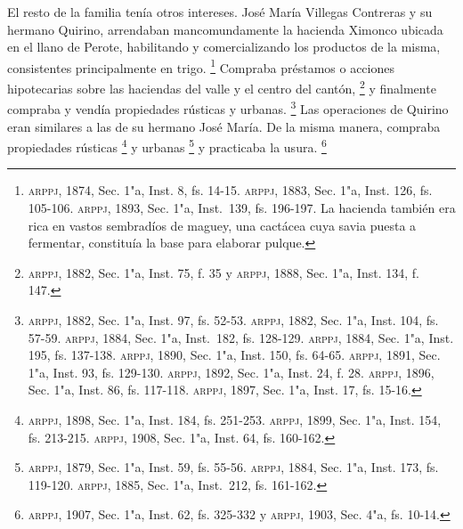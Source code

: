 \documentclass[14pt,twoside,final]{extbook} %
\let\oldfootnote\footnote
\renewcommand\footnote[1]{%
\oldfootnote{\hspace{1mm}#1}}
\begin{document}
El resto de la familia tenía otros intereses. José María Villegas Contreras y su hermano Quirino, arrendaban mancomundamente la hacienda Ximonco ubicada en el llano de Perote, habilitando y comercializando los productos de la misma, consistentes principalmente en trigo.\footnote{\textsc{arppj}, 1874, Sec. 1"a, Inst. 8, fs. 14-15. \textsc{arppj}, 1883, Sec. 1"a, Inst. 126, fs. 105-106. \textsc{arppj}, 1893, Sec. 1"a, Inst.~139, fs. 196-197. La hacienda también era rica en vastos sembradíos de maguey, una cactácea cuya savia puesta a fermentar, constituía la base para elaborar pulque.} Compraba préstamos o acciones hipotecarias sobre las haciendas del valle y el centro del cantón,\footnote{\textsc{arppj}, 1882, Sec. 1"a, Inst. 75, f. 35 y \textsc{arppj}, 1888, Sec. 1"a, Inst. 134, f. 147.} y finalmente compraba y vendía propiedades rústicas y urbanas.\footnote{\textsc{arppj}, 1882, Sec. 1"a, Inst. 97, fs. 52-53. \textsc{arppj}, 1882, Sec. 1"a, Inst. 104, fs. 57-59. \textsc{arppj}, 1884, Sec. 1"a, Inst.~182, fs. 128-129. \textsc{arppj}, 1884, Sec. 1"a, Inst. 195, fs. 137-138. \textsc{arppj}, 1890, Sec. 1"a, Inst. 150, fs. 64-65. \textsc{arppj}, 1891, Sec. 1"a, Inst. 93, fs. 129-130. \textsc{arppj}, 1892, Sec. 1"a, Inst. 24, f. 28. \textsc{arppj}, 1896, Sec. 1"a, Inst. 86, fs. 117-118. \textsc{arppj}, 1897, Sec. 1"a, Inst. 17, fs. 15-16.} Las operaciones de Quirino eran similares a las de su hermano José María. De la misma manera, compraba propiedades rústicas\footnote{\textsc{arppj}, 1898, Sec. 1"a, Inst. 184, fs. 251-253. \textsc{arppj}, 1899, Sec. 1"a, Inst. 154, fs. 213-215. \textsc{arppj}, 1908, Sec. 1"a, Inst. 64, fs. 160-162.} y urbanas\footnote{\textsc{arppj}, 1879, Sec. 1"a, Inst. 59, fs. 55-56. \textsc{arppj}, 1884, Sec. 1"a, Inst. 173, fs. 119-120. \textsc{arppj}, 1885, Sec. 1"a, Inst.~212, fs. 161-162.} y practicaba la usura.\footnote{\textsc{arppj}, 1907, Sec. 1"a, Inst. 62, fs. 325-332 y \textsc{arppj}, 1903, Sec. 4"a, fs. 10-14.}
\end{document}
